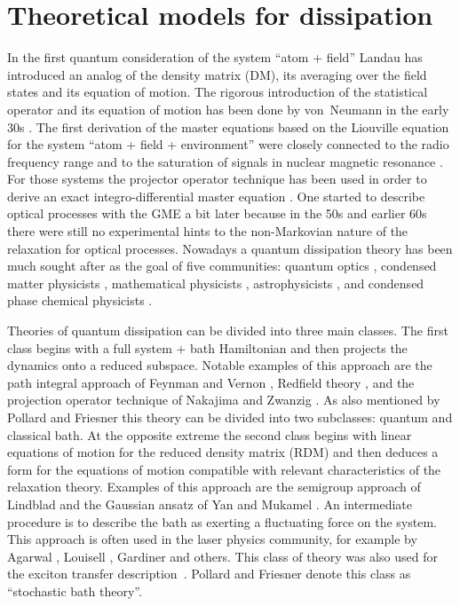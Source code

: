 \documentclass[12pt,twoside,a4paper]{report}
\begin{document}
\section{Theoretical models for dissipation}\label{theor-mod}
     In the first quantum consideration of the system ``atom + field''
Landau \cite{land27} has introduced an analog of the density matrix (DM), 
its averaging over the field states and its equation of motion.
     The rigorous introduction of the statistical operator and 
its equation of motion
has been done by von~Neumann in the early 30s \cite{neum32}.
     The first derivation of the master equations based on the Liouville equation 
for the system ``atom + field + environment''
were closely connected to 
the radio frequency range and to 
the saturation of signals in nuclear magnetic resonance
\cite{kubo54,bloc56,argy64,redf55}.
For those systems the projector operator technique has been used 
in order
to derive an exact integro-differential master equation \cite{argy64}.
     One started to describe optical processes with the GME
a bit later \cite{szik69}
because in the 50s and earlier 60s there were still no
experimental hints to the
non-Markovian
nature of the relaxation \cite{carl77} for optical processes.
     Nowadays a  quantum dissipation theory 
has been  much sought after as the goal of five communities:
quantum optics
\cite{agar71,haak73,hake70,loui73,gard91},
condensed matter physicists
\cite{feyn63,cald83,grab88,grab84},
mathematical physicists
\cite{lind76A,gori76,lind76B,davi76,alic87},
astrophysicists
\cite{unru89},
and condensed phase chemical physicists
\cite{oppe87,naka58,zwan61,bern71,muka88,kamp92,sevi89,poll94,pech91,pech94,bade94}.

Theories of quantum dissipation can be divided into three main classes.
The first class begins with a full system + bath Hamiltonian 
and then projects the dynamics onto a reduced subspace.
Notable examples of this approach are the path integral approach of Feynman
and Vernon \cite{feyn63}, Redfield theory \cite{redf55}, and the
projection operator technique of Nakajima \cite{naka58}
and Zwanzig \cite{zwan61}. 
As also mentioned by 
Pollard and Friesner \cite{poll94} 
this theory can be divided
into two subclasses:
quantum and classical bath.
     At the opposite extreme the second class begins 
with  linear equations of motion for 
the reduced density matrix (RDM) and then 
deduces a form for the equations of motion compatible with 
relevant characteristics of the  relaxation theory.
Examples of this approach are the semigroup approach of Lindblad \cite{lind76A}
and the Gaussian ansatz of Yan and Mukamel \cite{muka88}.
     An intermediate procedure is to describe the bath 
as exerting a fluctuating force on the system.
This approach is often used in the laser physics community, for example
by Agarwal \cite{agar71}, Louisell \cite{loui73}, Gardiner \cite{gard91} 
and others.
This class of theory was also used for the exciton 
transfer description~\cite{rein82}.
Pollard and Friesner \cite{poll94} 
denote  this class  as ``stochastic bath theory''.
\end{document}
